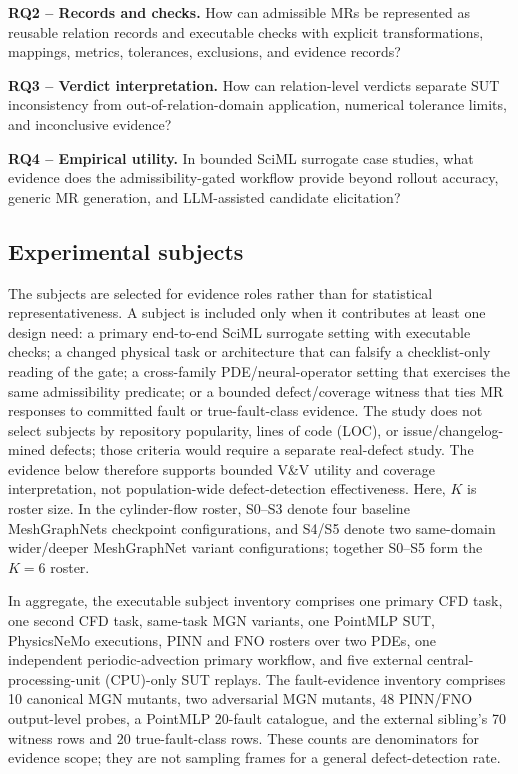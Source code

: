 \documentclass[preprint,12pt,authoryear]{elsarticle}
\begin{document}
\textbf{RQ2 -- Records and checks.} How can admissible MRs be represented as reusable relation records and executable checks with explicit transformations, mappings, metrics, tolerances, exclusions, and evidence records?

\textbf{RQ3 -- Verdict interpretation.} How can relation-level verdicts separate SUT inconsistency from out-of-relation-domain application, numerical tolerance limits, and inconclusive evidence?

\textbf{RQ4 -- Empirical utility.} In bounded SciML surrogate case studies, what evidence does the admissibility-gated workflow provide beyond rollout accuracy, generic MR generation, and LLM-assisted candidate elicitation?

\subsection{Experimental subjects}
\label{subsec:suts}

The subjects are selected for evidence roles rather than for statistical representativeness. A subject is included only when it contributes at least one design need: a primary end-to-end SciML surrogate setting with executable checks; a changed physical task or architecture that can falsify a checklist-only reading of the gate; a cross-family PDE/neural-operator setting that exercises the same admissibility predicate; or a bounded defect/coverage witness that ties MR responses to committed fault or true-fault-class evidence. The study does not select subjects by repository popularity, lines of code (LOC), or issue/changelog-mined defects; those criteria would require a separate real-defect study. The evidence below therefore supports bounded V\&V utility and coverage interpretation, not population-wide defect-detection effectiveness. Here, \(K\) is roster size. In the cylinder-flow roster, S0--S3 denote four baseline MeshGraphNets checkpoint configurations, and S4/S5 denote two same-domain wider/deeper MeshGraphNet variant configurations; together S0--S5 form the \(K=6\) roster.

In aggregate, the executable subject inventory comprises one primary CFD task, one second CFD task, same-task MGN variants, one PointMLP SUT, PhysicsNeMo executions, PINN and FNO rosters over two PDEs, one independent periodic-advection primary workflow, and five external central-processing-unit (CPU)-only SUT replays. The fault-evidence inventory comprises 10 canonical MGN mutants, two adversarial MGN mutants, 48 PINN/FNO output-level probes, a PointMLP 20-fault catalogue, and the external sibling's 70 witness rows and 20 true-fault-class rows. These counts are denominators for evidence scope; they are not sampling frames for a general defect-detection rate.
\end{document}
